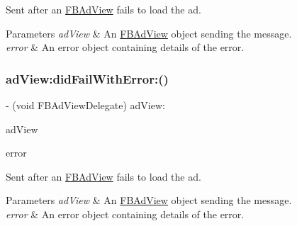 Sent after an \hyperlink{interfaceFBAdView}{F\+B\+Ad\+View} fails to load the ad.


\begin{DoxyParams}{Parameters}
{\em ad\+View} & An \hyperlink{interfaceFBAdView}{F\+B\+Ad\+View} object sending the message. \\
\hline
{\em error} & An error object containing details of the error. \\
\hline
\end{DoxyParams}
\mbox{\label{protocolFBAdViewDelegate_01-p_a2fc4eecd46ddc75a41e925c9b07d25b8}} 
\subsubsection{\texorpdfstring{ad\+View\+:did\+Fail\+With\+Error\+:()}{adView:didFailWithError:()}\hspace{0.1cm}{\footnotesize\ttfamily [3/5]}}
{\footnotesize\ttfamily -\/ (void F\+B\+Ad\+View\+Delegate) ad\+View\+: \begin{DoxyParamCaption}\item[{(\hyperlink{interfaceFBAdView}{F\+B\+Ad\+View} $\ast$)}]{ad\+View }\item[{didFailWithError:(N\+S\+Error $\ast$)}]{error }\end{DoxyParamCaption}\hspace{0.3cm}{\ttfamily [optional]}}

Sent after an \hyperlink{interfaceFBAdView}{F\+B\+Ad\+View} fails to load the ad.


\begin{DoxyParams}{Parameters}
{\em ad\+View} & An \hyperlink{interfaceFBAdView}{F\+B\+Ad\+View} object sending the message. \\
\hline
{\em error} & An error object containing details of the error. \\
\hline
\end{DoxyParams}
\mbox{\label{protocolFBAdViewDelegate_01-p_a2fc4eecd46ddc75a41e925c9b07d25b8}} 
